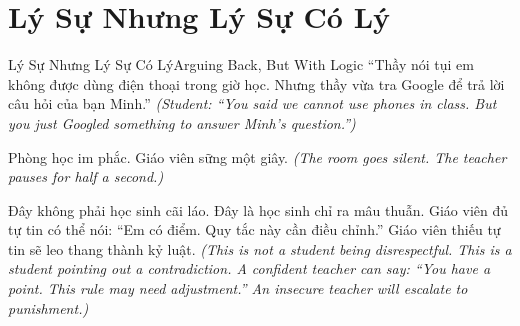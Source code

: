 \section{Lý Sự Nhưng Lý Sự Có Lý}
\begin{truyen}{Lý Sự Nhưng Lý Sự Có Lý}{Arguing Back, But With Logic}
 ``Thầy nói tụi em không được dùng điện thoại trong giờ học. Nhưng thầy vừa tra Google để trả lời câu hỏi của bạn Minh.''
\textit{(Student: ``You said we cannot use phones in class. But you just Googled something to answer Minh's question.'')}

Phòng học im phắc. Giáo viên sững một giây.
\textit{(The room goes silent. The teacher pauses for half a second.)}



\begin{baihoc}
Đây không phải học sinh cãi láo. Đây là học sinh chỉ ra mâu thuẫn. Giáo viên đủ tự tin có thể nói: ``Em có điểm. Quy tắc này cần điều chỉnh.'' Giáo viên thiếu tự tin sẽ leo thang thành kỷ luật.
\textit{(This is not a student being disrespectful. This is a student pointing out a contradiction. A confident teacher can say: ``You have a point. This rule may need adjustment.'' An insecure teacher will escalate to punishment.)}
\end{baihoc}
\end{truyen}

